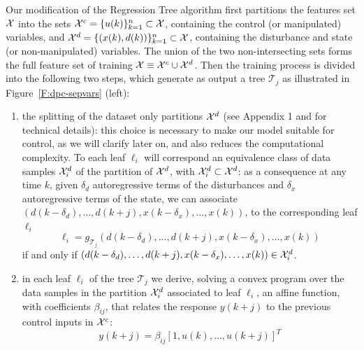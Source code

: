 \textcolor[rgb]{0,0,1}{Our modification of the Regression Tree algorithm first partitions the features set $\mathcal{X}$ into the sets $\mathcal{X}^c = \{u(k)\}_{k=1}^n\subset\mathcal{X}$, containing the control (or manipulated) variables, and $\mathcal{X}^d = \{(x(k),d(k))\}_{k=1}^n\subset\mathcal{X}$, containing the disturbance and state (or non-manipulated) variables. The  union of the two non-intersecting sets forms the full feature set of training $\mathcal{X} \equiv \mathcal{X}^c \cup \mathcal{X}^d$.
Then the training process is divided into the following two steps, which generate as output a tree $\mathcal{T}_j$ as illustrated in Figure~\ref{F:dpc-sepvars} (left):
\begin{enumerate}
	\item the splitting of the dataset only partitions $\mathcal{X}^d$ (see Appendix 1 and \cite{hastie2009elements} for technical details): this choice is necessary to make our model suitable for control, as we will clarify later on, and also reduces the computational complexity. To each leaf $\ell_i$ will correspond an equivalence class of data samples $\mathcal{X}^d_i$ of the partition of $\mathcal{X}^d$, with $\mathcal{X}^d_i\subset \mathcal{X}^d$: as a consequence at any time $k$, given $\delta_d$ autoregressive terms of the disturbances and $\delta_x$ autoregressive terms of the state, we can associate $( d(k-\delta_d),\ldots,d(k+j),x(k-\delta_x),\ldots,x(k) )$, to the corresponding leaf $\ell_i$
	\begin{equation}\label{E:model_tree}
		\ell_i = \mathit{g}_{\mathcal{T}_j} \left( d(k-\delta_d),\ldots,d(k+j),x(k-\delta_x),\ldots,x(k)  \right)
	\end{equation}
	if and only if $( d(k-\delta_d),\ldots,d(k+j),x(k-\delta_x),\ldots,x(k)) \in \mathcal{X}^d_i$.
	\item in each leaf $\ell_i$ of the tree $\mathcal{T}_j$ we derive, solving a convex program over the data samples in the partition $\mathcal{X}^d_i$ associated to leaf $\ell_i$, an affine function, with coefficients $\beta_{ij}$, that relates the response $y(k+j)$ to the previous control inputs in $\mathcal{X}^c$:
	\begin{equation}\label{E:model_leaf}
		y(k+j) =  \beta_{ij} [1,u(k),\ldots,u(k+j) ]^T

\end{equation}
\end{enumerate}}
